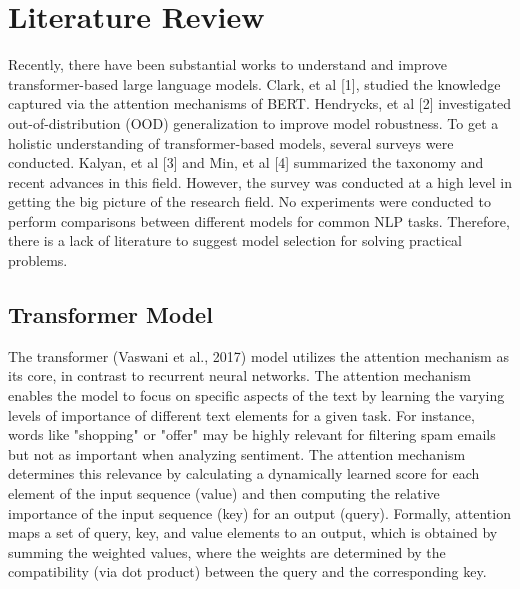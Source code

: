 \documentclass{article}
\begin{document}
 \section{Literature Review}
 Recently, there have been substantial works to understand and improve transformer-based large language models. Clark, et al [1], studied the knowledge captured via the attention mechanisms of BERT. Hendrycks, et al [2] investigated out-of-distribution (OOD) generalization to improve model robustness. To get a holistic understanding of transformer-based models, several surveys were conducted. Kalyan, et al [3] and Min, et al [4] summarized the taxonomy and recent advances in this field. However, the survey was conducted at a high level in getting the big picture of the research field. No experiments were conducted to perform comparisons between different models for common NLP tasks. Therefore, there is a lack of literature to suggest model selection for solving practical problems.
 \subsection{Transformer Model}
 The transformer (Vaswani et al., 2017) model utilizes the attention mechanism as its core, in contrast to recurrent neural networks. The attention mechanism enables the model to focus on specific aspects of the text by learning the varying levels of importance of different text elements for a given task. For instance, words like "shopping" or "offer" may be highly relevant for filtering spam emails but not as important when analyzing sentiment. The attention mechanism determines this relevance by calculating a dynamically learned score for each element of the input sequence (value) and then computing the relative importance of the input sequence (key) for an output (query). Formally, attention maps a set of query, key, and value elements to an output, which is obtained by summing the weighted values, where the weights are determined by the compatibility (via dot product) between the query and the corresponding key.
\end{document}
